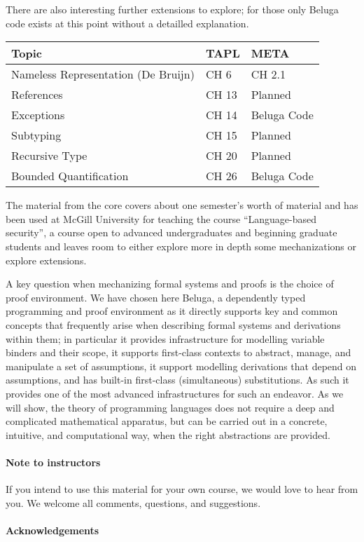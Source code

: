 There are also interesting further extensions to explore; for those only Beluga code exists at this point without a detailled explanation. 

\begin{center}
\begin{tabular}{p{9cm}|p{2.25cm}|p{2.75cm}}
 Topic & TAPL & META \\
\hline    
Nameless Representation (De Bruijn) & CH 6 & CH 2.1 \\  
References & CH 13 & Planned \\
Exceptions & CH 14 & Beluga Code \\
Subtyping & CH 15 & Planned \\
Recursive Type & CH 20 & Planned\\
Bounded Quantification & CH 26 & Beluga Code \\
\end{tabular}
\end{center}


The material from the core covers about one semester's worth of material and has been used at McGill University for teaching the course ``Language-based security'', a course open to advanced undergraduates and beginning graduate students and leaves room to either explore more in depth some mechanizations or explore extensions.

A key question when mechanizing formal systems and proofs is the choice of proof environment.  We have chosen here Beluga, a dependently typed programming and proof environment as it directly supports key and common concepts that frequently arise when describing formal systems and derivations within them; in particular it provides infrastructure for modelling variable binders and their scope, it supports first-class contexts to abstract, manage, and manipulate a set of assumptions, it support modelling derivations that depend on assumptions, and has built-in first-class (simultaneous) substitutions.  As such it provides one of the most advanced infrastructures for such an endeavor. As we will show,  the theory of programming languages does
not require a deep and complicated mathematical apparatus, but can be carried out in a concrete, intuitive, and computational way, when the right abstractions are provided. 



\paragraph{Note to instructors}
If you intend to use this material for your own course, we would love to hear from you. We welcome all comments, questions, and suggestions.

\paragraph{Acknowledgements}

